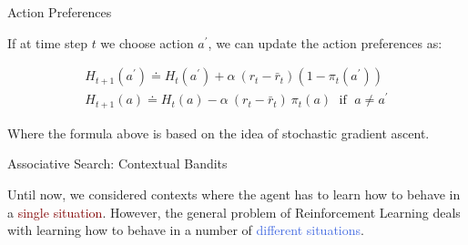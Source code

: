 \documentclass{beamer}
\begin{document}






\begin{frame}{Action Preferences}

If at time step $t$ we choose action $a^{\prime}$, we can update the action preferences as:


\begin{align*}
H_{t+1}(a^{\prime}) \doteq H_t(a^{\prime}) + \alpha \: (r_t - \bar r_t) (1 - \pi_t(a^{\prime}))\\
H_{t+1}(a) \doteq H_t(a) - \alpha \:  (r_t - \bar r_t) \: \pi_t(a) \; \text{ if } \; a \neq a^{\prime}
\end{align*}

\vspace{2mm}

Where the formula above is based on the idea of stochastic gradient ascent.


\end{frame}

\begin{frame}{Associative Search: Contextual Bandits}

Until now, we considered contexts where the agent has to learn how to behave in a \textcolor{Maroon}{single situation}.
However, the general problem of Reinforcement Learning deals with learning how to behave in a number of \textcolor{RoyalBlue}{different situations}.

\end{frame}
\end{document}
